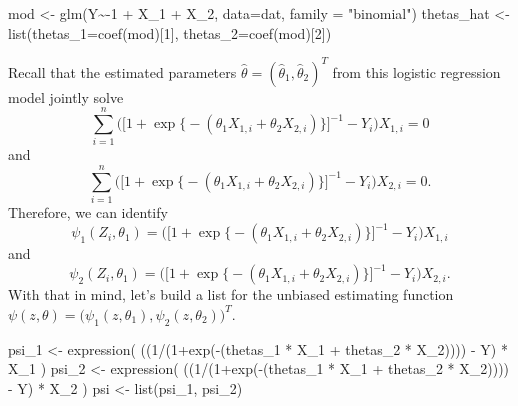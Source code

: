 \documentclass[
]{article}
\newenvironment{Shaded}{\begin{snugshade}}{\end{snugshade}}
\newcommand{\AttributeTok}[1]{\textcolor[rgb]{0.77,0.63,0.00}{#1}}
\newcommand{\DecValTok}[1]{\textcolor[rgb]{0.00,0.00,0.81}{#1}}
\newcommand{\FunctionTok}[1]{\textcolor[rgb]{0.00,0.00,0.00}{#1}}
\newcommand{\NormalTok}[1]{#1}
\newcommand{\OtherTok}[1]{\textcolor[rgb]{0.56,0.35,0.01}{#1}}
\newcommand{\SpecialCharTok}[1]{\textcolor[rgb]{0.00,0.00,0.00}{#1}}
\newcommand{\StringTok}[1]{\textcolor[rgb]{0.31,0.60,0.02}{#1}}
\begin{document}
\begin{Shaded}
\begin{Highlighting}[]
\NormalTok{mod }\OtherTok{\textless{}{-}} \FunctionTok{glm}\NormalTok{(Y}\SpecialCharTok{\textasciitilde{}{-}}\DecValTok{1} \SpecialCharTok{+}\NormalTok{ X\_1 }\SpecialCharTok{+}\NormalTok{ X\_2, }\AttributeTok{data=}\NormalTok{dat, }\AttributeTok{family =} \StringTok{"binomial"}\NormalTok{)}
\NormalTok{thetas\_hat }\OtherTok{\textless{}{-}} \FunctionTok{list}\NormalTok{(}\AttributeTok{thetas\_1=}\FunctionTok{coef}\NormalTok{(mod)[}\DecValTok{1}\NormalTok{], }\AttributeTok{thetas\_2=}\FunctionTok{coef}\NormalTok{(mod)[}\DecValTok{2}\NormalTok{])}
\end{Highlighting}
\end{Shaded}

Recall that the estimated parameters
\(\hat{\theta}=(\hat{\theta}_1, \hat{\theta}_2)^T\) from this logistic
regression model jointly solve
\[\sum_{i=1}^{n}\bigg(\Big[1+\exp\big\{-{(\theta_1X_{1,i}+\theta_2X_{2,i})\big\}\Big]^{-1}}-Y_i\bigg)X_{1,i}
=0\] and
\[\sum_{i=1}^{n}\bigg(\Big[1+\exp\big\{-{(\theta_1X_{1,i}+\theta_2X_{2,i})\big\}\Big]^{-1}}-Y_i\bigg)X_{2,i}
=0.\] Therefore, we can identify
\[\psi_1(Z_i,\theta_1)=\bigg(\Big[1+\exp\big\{-{(\theta_1X_{1,i}+\theta_2X_{2,i})\big\}\Big]^{-1}}-Y_i\bigg)X_{1,i}\]
and
\[\psi_2(Z_i,\theta_1)=\bigg(\Big[1+\exp\big\{-{(\theta_1X_{1,i}+\theta_2X_{2,i})\big\}\Big]^{-1}}-Y_i\bigg)X_{2,i}.\]
With that in mind, let's build a list for the unbiased estimating
function
\(\psi(z,\theta)=\Big(\psi_1(z,\theta_1), \psi_2(z,\theta_2)\Big)^T\).

\begin{Shaded}
\begin{Highlighting}[]
\NormalTok{psi\_1 }\OtherTok{\textless{}{-}} \FunctionTok{expression}\NormalTok{( ((}\DecValTok{1}\SpecialCharTok{/}\NormalTok{(}\DecValTok{1}\SpecialCharTok{+}\FunctionTok{exp}\NormalTok{(}\SpecialCharTok{{-}}\NormalTok{(thetas\_1 }\SpecialCharTok{*}\NormalTok{ X\_1 }\SpecialCharTok{+}\NormalTok{ thetas\_2 }\SpecialCharTok{*}\NormalTok{ X\_2)))) }\SpecialCharTok{{-}}\NormalTok{ Y) }\SpecialCharTok{*}\NormalTok{ X\_1 )}
\NormalTok{psi\_2 }\OtherTok{\textless{}{-}} \FunctionTok{expression}\NormalTok{( ((}\DecValTok{1}\SpecialCharTok{/}\NormalTok{(}\DecValTok{1}\SpecialCharTok{+}\FunctionTok{exp}\NormalTok{(}\SpecialCharTok{{-}}\NormalTok{(thetas\_1 }\SpecialCharTok{*}\NormalTok{ X\_1 }\SpecialCharTok{+}\NormalTok{ thetas\_2 }\SpecialCharTok{*}\NormalTok{ X\_2)))) }\SpecialCharTok{{-}}\NormalTok{ Y) }\SpecialCharTok{*}\NormalTok{ X\_2 )}
\NormalTok{psi }\OtherTok{\textless{}{-}} \FunctionTok{list}\NormalTok{(psi\_1, psi\_2)}
\end{Highlighting}
\end{Shaded}
\end{document}
